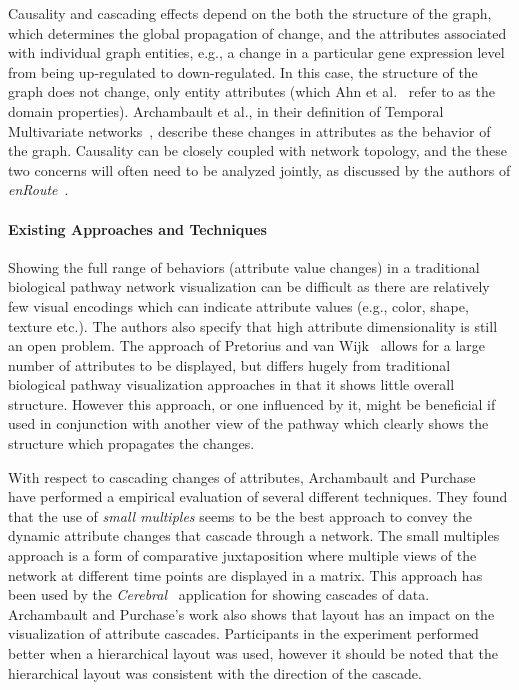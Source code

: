 \documentclass[twocolumn]{bmcart}%
\begin{document}
Causality and cascading effects depend on the both the structure of the graph, which determines the global propagation of change, and the attributes associated with individual graph entities, e.g., a change in a particular gene expression level from being up-regulated to down-regulated.
In this case, the structure of the graph does not change, only entity attributes (which Ahn et al.~\cite{Ahn2014} refer to as the domain properties).
Archambault et al., in their definition of Temporal Multivariate networks~\cite{archambault2014temporal}, describe these changes in attributes as the behavior of the graph.
Causality can be closely coupled with network topology, and the these two concerns will often need to be analyzed jointly, as discussed by the authors of \textit{enRoute}~\cite{Partl2012enroute}.

\paragraph*{Existing Approaches and Techniques}

Showing the full range of behaviors (attribute value changes) in a traditional biological pathway network visualization can be difficult as there are relatively few visual encodings which can indicate attribute values (e.g., color, shape, texture etc.).
The authors also specify that high attribute dimensionality is still an open problem.
The approach of Pretorius and van Wijk~\cite{pretorius2008} allows for a large number of attributes to be displayed, but differs hugely from traditional biological pathway visualization approaches in that it shows little overall structure.
However this approach, or one influenced by it, might be beneficial if used in conjunction with another view of the pathway which clearly shows the structure which propagates the changes.

With respect to cascading changes of attributes, Archambault and Purchase~\cite{Archambault2016} have performed a empirical evaluation of several different techniques.
They found that the use of \emph{small multiples} seems to be the best approach to convey the dynamic attribute changes that cascade through a network.
The small multiples approach is a form of comparative juxtaposition where multiple views of the network at different time points are displayed in a matrix.
This approach has been used by the \textit{Cerebral}~\cite{Barsky2008cerebral} application for showing cascades of data.
Archambault and Purchase's work also shows that layout has an impact on the visualization of attribute cascades.
Participants in the experiment performed better when a hierarchical layout was used, however it should be noted that the hierarchical layout was consistent with the direction of the cascade.
\end{document}
